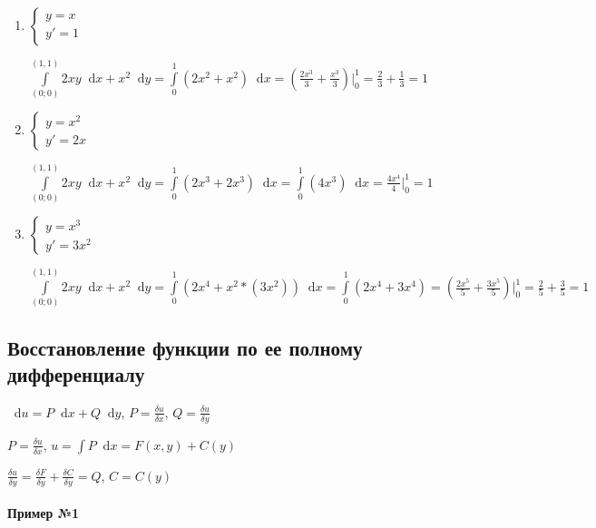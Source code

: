 \documentclass{article}
\newcommand*\diff{\mathop{}\!\mathrm{d}}
\begin{document}
\begin{enumerate}
    \item 

    $\begin{cases}
        y = x \\
        y' = 1
    \end{cases}$

    $\int\limits_{(0; 0)}^{(1,1)} 2xy \diff x + x^2 \diff y = \int\limits_{0}^{1} (2x^2 + x^2) \diff x = (\frac{2x^3}{3} + \frac{x^3}{3}) \bigg|_{0}^{1} = \frac{2}{3} + \frac{1}{3} = 1$
    
    \item 

    $\begin{cases}
        y = x^2 \\
        y' = 2x
    \end{cases}$

    $\int\limits_{(0; 0)}^{(1,1)} 2xy \diff x + x^2 \diff y = \int\limits_{0}^{1} (2x^3 + 2x^3) \diff x = \int\limits_{0}^{1} (4x^3) \diff x = \frac{4x^4}{4} \bigg|_{0}^{1} = 1$

    \item

    $\begin{cases}
        y = x^3 \\
        y' = 3x^2
    \end{cases}$

    $\int\limits_{(0; 0)}^{(1,1)} 2xy \diff x + x^2 \diff y = \int\limits_{0}^{1} (2x^4 + x^2 * (3x^2)) \diff x = \int\limits_{0}^{1} (2x^4 + 3x^{4}) = (\frac{2x^5}{5} + \frac{3x^5}{5}) \bigg|_{0}^{1} = \frac{2}{5} + \frac{3}{5} = 1$
\end{enumerate}

\subsection{Восстановление функции по ее полному дифференциалу}

$\diff u = P \diff x + Q \diff y$, $P = \frac{\delta u}{\delta x}$, $Q = \frac{\delta u}{\delta y}$

$P = \frac{\delta u}{\delta x}$, $u = \int P \diff x = F(x, y) + C(y)$

$\frac{\delta u}{\delta y} = \frac{\delta F}{\delta y} + \frac{\delta C}{\delta y} = Q$, $C = C(y)$

\paragraph{Пример №1}
\end{document}
